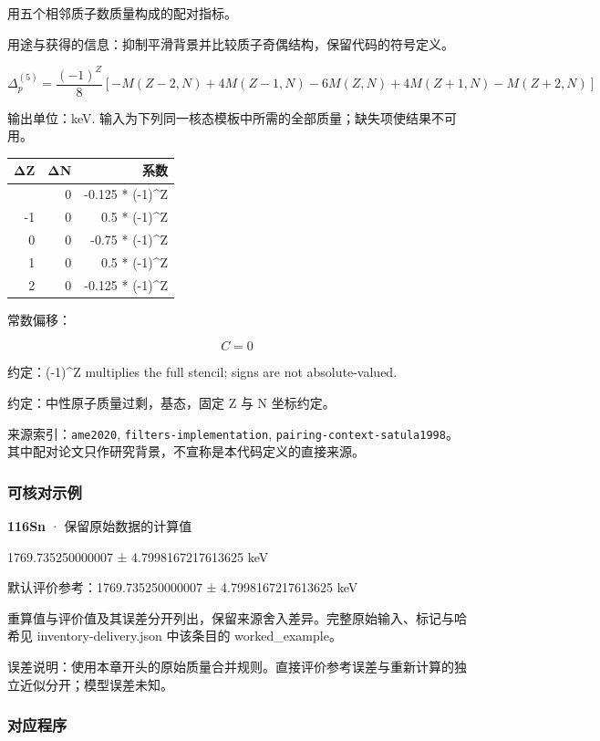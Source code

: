 \documentclass[
  11pt,
  letterpaper,
]{article}
\begin{document}
用五个相邻质子数质量构成的配对指标。

用途与获得的信息：抑制平滑背景并比较质子奇偶结构，保留代码的符号定义。

\[
\Delta_p^{(5)}=\frac{(-1)^Z}{8}[-M(Z-2,N)+4M(Z-1,N)-6M(Z,N)+4M(Z+1,N)-M(Z+2,N)]
\]

输出单位：keV.
输入为下列同一核态模板中所需的全部质量；缺失项使结果不可用。

\begin{longtable}[]{@{}rrr@{}}
\toprule\noalign{}
ΔZ & ΔN & 系数 \\
\midrule\noalign{}
\endhead
\bottomrule\noalign{}
\endlastfoot
-2 & 0 & -0.125 * (-1)\^{}Z \\
-1 & 0 & 0.5 * (-1)\^{}Z \\
0 & 0 & -0.75 * (-1)\^{}Z \\
1 & 0 & 0.5 * (-1)\^{}Z \\
2 & 0 & -0.125 * (-1)\^{}Z \\
\end{longtable}

常数偏移：

\[
C=0
\]

约定：(-1)\^{}Z multiplies the full stencil; signs are not
absolute-valued.

约定：中性原子质量过剩，基态，固定 Z 与 N 坐标约定。

来源索引：\texttt{ame2020}, \texttt{filters-implementation},
\texttt{pairing-context-satula1998}。其中配对论文只作研究背景，不宣称是本代码定义的直接来源。

\subsubsection{可核对示例}\label{ux53efux6838ux5bf9ux793aux4f8b-25}

\textbf{116Sn} · 保留原始数据的计算值

1769.735250000007 ± 4.7998167217613625 keV

默认评价参考：1769.735250000007 ± 4.7998167217613625 keV

重算值与评价值及其误差分开列出，保留来源舍入差异。完整原始输入、标记与哈希见
inventory-delivery.json 中该条目的 worked\_example。

误差说明：使用本章开头的原始质量合并规则。直接评价参考误差与重新计算的独立近似分开；模型误差未知。

\subsubsection{对应程序}\label{ux5bf9ux5e94ux7a0bux5e8f-25}
\end{document}
